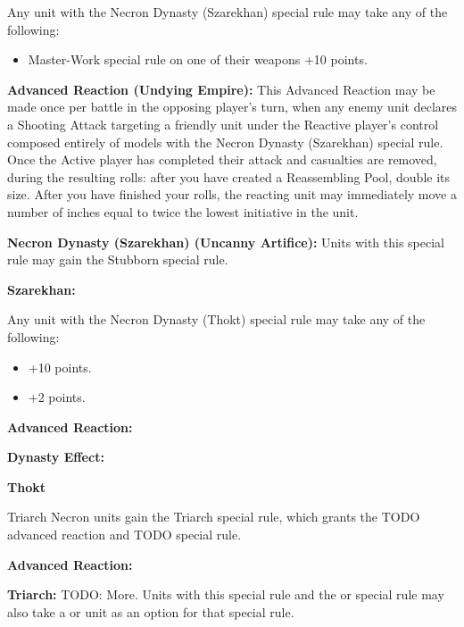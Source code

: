 Any unit with the Necron Dynasty (Szarekhan) special rule may take any of the following:
\begin{itemize}
	\item Master-Work special rule on one of their weapons \dotfill +10 points.
\end{itemize}

\textbf{Advanced Reaction (Undying Empire):} This Advanced Reaction may be made once per battle in the opposing player's turn, when any enemy unit declares a Shooting Attack targeting a friendly unit under the Reactive player's control composed entirely of models with the Necron Dynasty (Szarekhan) special rule. Once the Active player has completed their attack and casualties are removed, during the resulting  rolls: after you have created a Reassembling Pool, double its size. After you have finished your  rolls, the reacting unit may immediately move a number of inches equal to twice the lowest initiative in the unit.

\textbf{Necron Dynasty (Szarekhan) (Uncanny Artifice):} Units with this special rule may gain the Stubborn special rule. %

\textbf{Szarekhan:}


\newpage
{}

Any unit with the Necron Dynasty (Thokt) special rule may take any of the following:
\begin{itemize}
	\item {} \dotfill +10 points.
	\item {} \dotfill +2 points.
\end{itemize}

\textbf{Advanced Reaction:}

\textbf{Dynasty Effect:} 

\textbf{Thokt}


\newpage
{}

Triarch Necron units gain the Triarch special rule, which grants the TODO advanced reaction and TODO special rule.

\textbf{Advanced Reaction:}

\textbf{Triarch:} TODO: More. Units with this special rule and the  or  special rule may also take a  or  unit as an option for that special rule.

